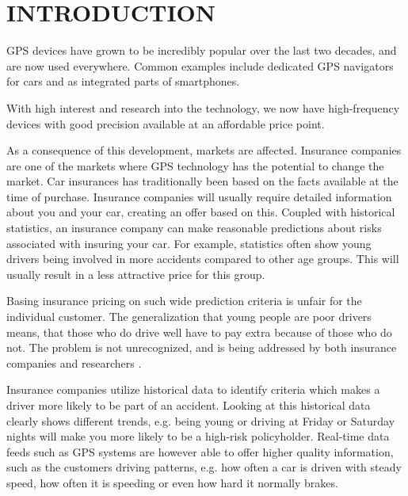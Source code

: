 \section{INTRODUCTION}
\label{sec:intro}



GPS devices have grown to be incredibly popular over the last two decades, and are now used everywhere. Common examples include dedicated GPS navigators for cars and as integrated parts of smartphones.

With high interest and research into the technology, we now have high-frequency devices with good precision available at an affordable price point.\cite{art:telematicsmatter}

As a consequence of this development, markets are affected. Insurance companies are one of the markets where GPS technology has the potential to change the market. Car insurances has traditionally been based on the facts available at the time of purchase. Insurance companies will usually require detailed information about you and your car, creating an offer based on this. Coupled with historical statistics, an insurance company can make reasonable predictions about risks associated with insuring your car. For example, statistics often show young drivers being involved in more accidents compared to other age groups\cite{accidents}. This will usually result in a less attractive price for this group.

Basing insurance pricing on such wide prediction criteria is unfair for the individual customer. The generalization that young people are poor drivers means, that those who do drive well have to pay extra because of those who do not. The problem is not unrecognized, and is being addressed by both insurance companies and researchers \cite{mar:ubi16}.

Insurance companies utilize historical data to identify criteria which makes a driver more likely to be part of an accident. Looking at this historical data clearly shows different trends\cite{url:forbes}, e.g. being young or driving at Friday or Saturday nights will make you more likely to be a high-risk policyholder. Real-time data feeds such as GPS systems are however able to offer higher quality information, such as the customers driving patterns, e.g. how often a car is driven with steady speed, how often it is speeding or even how hard it normally brakes.

